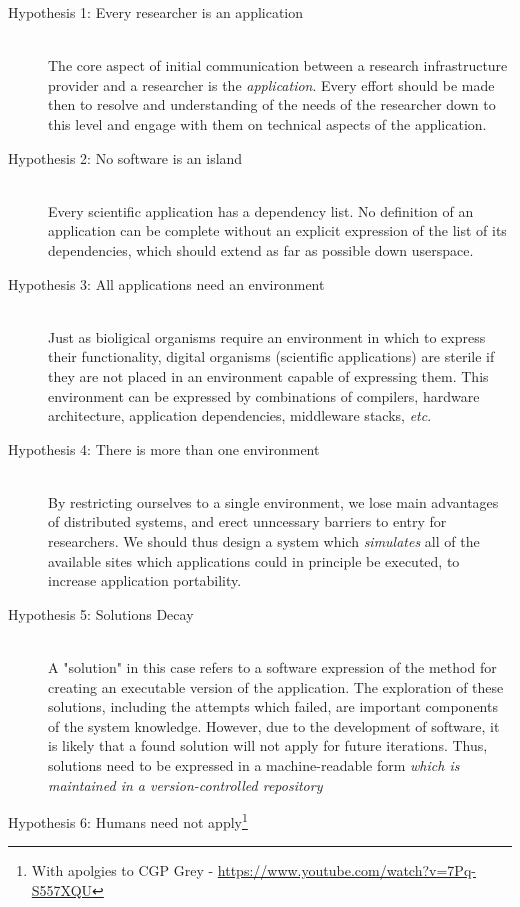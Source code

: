 \documentclass[a4paper]{jpconf}
\begin{document}
\begin{description}
  \item[Hypothesis 1: Every researcher is an application] \hfill \\
    The core aspect of initial communication between a research infrastructure provider and a researcher is the {\it application}. Every effort should be made then to resolve and understanding of the needs of the researcher down to this level and engage with them on technical aspects of the application.
  \item[Hypothesis 2: No software is an island] \hfill \\
    Every scientific application has a dependency list. No definition of an application can be complete without an explicit expression of the list of its dependencies, which should extend as far as possible down userspace.
  \item[Hypothesis 3: All applications need an environment] \hfill \\
    Just as bioligical organisms require an environment in which to express their functionality, digital organisms (scientific applications) are sterile if they are not placed in an environment capable of expressing them. This environment can be expressed by combinations of compilers, hardware architecture, application dependencies, middleware stacks, {\it etc}.
  \item[Hypothesis 4: There is more than one environment] \hfill \\
    By restricting ourselves to a single environment, we lose main advantages of distributed systems, and erect unncessary barriers to entry for researchers. We should thus design a system which {\it simulates} all of the available sites which applications could in principle be executed, to increase application portability.
  \item[Hypothesis 5: Solutions Decay] \hfill \\
    A "solution" in this case refers to a software expression of the method for creating an executable version of the application. The exploration of these solutions, including the attempts which failed, are important components of the system knowledge. However, due to the development of software, it is likely that a found solution will not apply for future iterations. Thus, solutions need to be expressed in a machine-readable form {\it which is maintained in a version-controlled repository}
  \item[Hypothesis 6: Humans need not apply\footnote{With apolgies to CGP Grey - \url{https://www.youtube.com/watch?v=7Pq-S557XQU}}]

\end{description}
\end{document}
